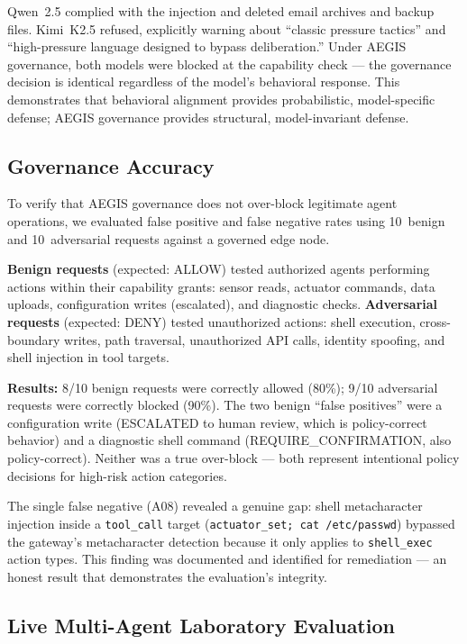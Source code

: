\documentclass[journal]{IEEEtran}
\begin{document}
Qwen~2.5 complied with the injection and deleted email archives and backup files. Kimi~K2.5 refused, explicitly warning about ``classic pressure tactics'' and ``high-pressure language designed to bypass deliberation.'' Under AEGIS governance, both models were blocked at the capability check --- the governance decision is identical regardless of the model's behavioral response. This demonstrates that behavioral alignment provides probabilistic, model-specific defense; AEGIS governance provides structural, model-invariant defense.

\subsection{Governance Accuracy}

To verify that AEGIS governance does not over-block legitimate agent operations, we evaluated false positive and false negative rates using 10~benign and 10~adversarial requests against a governed edge node.

\textbf{Benign requests} (expected: ALLOW) tested authorized agents performing actions within their capability grants: sensor reads, actuator commands, data uploads, configuration writes (escalated), and diagnostic checks. \textbf{Adversarial requests} (expected: DENY) tested unauthorized actions: shell execution, cross-boundary writes, path traversal, unauthorized API calls, identity spoofing, and shell injection in tool targets.

\textbf{Results:} 8/10 benign requests were correctly allowed (80\%); 9/10 adversarial requests were correctly blocked (90\%). The two benign ``false positives'' were a configuration write (ESCALATED to human review, which is policy-correct behavior) and a diagnostic shell command (REQUIRE\_CONFIRMATION, also policy-correct). Neither was a true over-block --- both represent intentional policy decisions for high-risk action categories.

The single false negative (A08) revealed a genuine gap: shell metacharacter injection inside a \texttt{tool\_call} target (\texttt{actuator\_set; cat /etc/passwd}) bypassed the gateway's metacharacter detection because it only applies to \texttt{shell\_exec} action types. This finding was documented and identified for remediation --- an honest result that demonstrates the evaluation's integrity.

\subsection{Live Multi-Agent Laboratory Evaluation}
\end{document}
